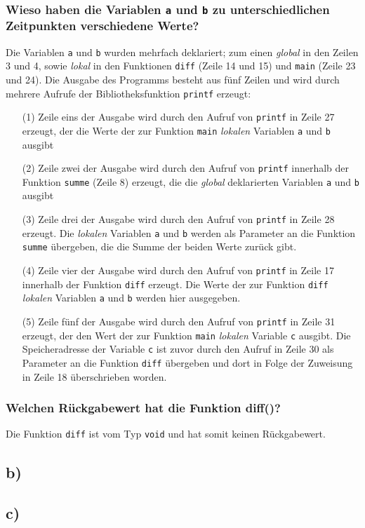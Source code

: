 \documentclass[11pt, a4paper]{scrartcl}
\begin{document}
\subsubsection*{Wieso haben die Variablen \texttt{a} und \texttt{b} zu unterschiedlichen Zeitpunkten verschiedene Werte?}
Die Variablen \texttt{a} und \texttt{b} wurden mehrfach deklariert; zum einen \textit{global} in den Zeilen 3 und 4, sowie \textit{lokal} in den Funktionen \texttt{diff} (Zeile 14 und 15) und \texttt{main} (Zeile 23 und 24). Die Ausgabe des Programms besteht aus fünf Zeilen und wird durch mehrere Aufrufe der Bibliotheksfunktion \texttt{printf} erzeugt:
\begin{enumerate}
\item[(1)] Zeile eins der Ausgabe wird durch den Aufruf von \texttt{printf} in Zeile 27 erzeugt, der die Werte der zur Funktion \texttt{main} \textit{lokalen} Variablen \texttt{a} und \texttt{b} ausgibt
\item[(2)] Zeile zwei der Ausgabe wird durch den Aufruf von \texttt{printf} innerhalb der Funktion \texttt{summe} (Zeile 8) erzeugt, die die \textit{global} deklarierten Variablen \texttt{a} und \texttt{b} ausgibt 
\item[(3)] Zeile drei der Ausgabe wird durch den Aufruf von \texttt{printf} in Zeile 28 erzeugt. Die \textit{lokalen} Variablen \texttt{a} und \texttt{b} werden als Parameter an die Funktion \texttt{summe} übergeben, die die Summe der beiden Werte zurück gibt.
\item[(4)] Zeile vier der Ausgabe wird durch den Aufruf von \texttt{printf} in Zeile 17 innerhalb der Funktion \texttt{diff} erzeugt. Die Werte der zur Funktion \texttt{diff} \textit{lokalen} Variablen \texttt{a} und \texttt{b} werden hier ausgegeben. 
\item[(5)] Zeile fünf der Ausgabe wird durch den Aufruf von \texttt{printf} in Zeile 31 erzeugt, der den Wert der zur Funktion \texttt{main} \textit{lokalen} Variable \texttt{c} ausgibt. Die Speicheradresse der Variable \texttt{c} ist zuvor durch den Aufruf in Zeile 30 als Parameter an die Funktion \texttt{diff} übergeben und dort in Folge der Zuweisung in Zeile 18 überschrieben worden. 
\end{enumerate} 
\subsubsection*{Welchen Rückgabewert hat die Funktion diff()?}
Die Funktion \texttt{diff} ist vom Typ \texttt{void} und hat somit keinen Rückgabewert.
\newpage
\subsection*{b)}

\newpage
\subsection*{c)}

\newpage
%
%
\end{document}
